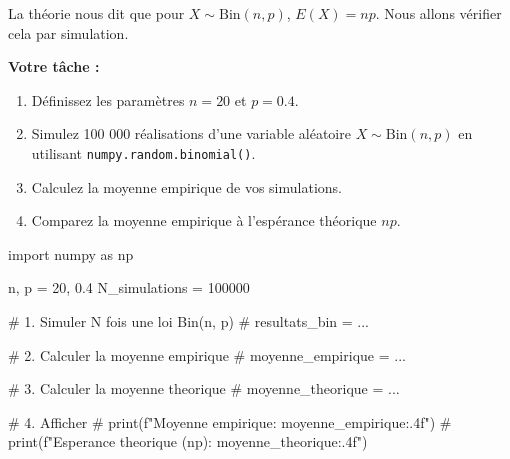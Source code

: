 \begin{exercicebox}
La théorie nous dit que pour $X \sim \text{Bin}(n, p)$, $E(X) = np$. Nous allons vérifier cela par simulation.

\textbf{Votre tâche :}
\begin{enumerate}
    \item Définissez les paramètres $n=20$ et $p=0.4$.
    \item Simulez 100 000 réalisations d'une variable aléatoire $X \sim \text{Bin}(n, p)$ en utilisant \texttt{numpy.random.binomial()}.
    \item Calculez la moyenne empirique de vos simulations.
    \item Comparez la moyenne empirique à l'espérance théorique $np$.
\end{enumerate}

\begin{codecell}
import numpy as np

n, p = 20, 0.4
N_simulations = 100000

# 1. Simuler N fois une loi Bin(n, p)
# resultats_bin = ...

# 2. Calculer la moyenne empirique
# moyenne_empirique = ...

# 3. Calculer la moyenne theorique
# moyenne_theorique = ...

# 4. Afficher
# print(f"Moyenne empirique: {moyenne_empirique:.4f}")
# print(f"Esperance theorique (np): {moyenne_theorique:.4f}")
\end{codecell}
\end{exercicebox}

